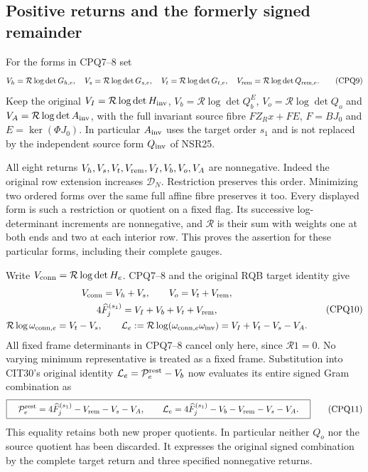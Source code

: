 \documentclass[11pt,a4paper]{article}
\begin{document}
\subsection{Positive returns and the formerly signed remainder}
For the forms in CPQ7--8 set
\[
 V_h=\mathcal R\log\det G_{h,e},\quad
 V_s=\mathcal R\log\det G_{s,e},\quad
 V_t=\mathcal R\log\det G_{t,e},\quad
 V_{\rm rem}=\mathcal R\log\det Q_{{\rm rem},e}.
 \tag{CPQ9}
\]
Keep the original $V_I=\mathcal R\log\det H_{\rm inv}$,
$V_b=\mathcal R\log\det Q_b^E$,
$V_o=\mathcal R\log\det Q_o$ and
$V_A=\mathcal R\log\det A_{\rm inv}$, with the full invariant
source fibre $FZ_Rx+FE$, $F=BJ_0$ and
$E=\ker(\Phi J_0)$. In particular $A_{\rm inv}$ uses the target
order $s_1$ and is not replaced by the independent source form
$Q_{\rm inv}$ of NSR25.

All eight returns $V_h,V_s,V_t,V_{\rm rem},V_I,V_b,V_o,V_A$
are nonnegative. Indeed the original row extension increases
$\mathcal D_N$. Restriction preserves this order. Minimizing two
ordered forms over the same full affine fibre preserves it too.
Every displayed form is such a restriction or quotient on a fixed
flag. Its successive log-determinant increments are nonnegative,
and $\mathcal R$ is their sum with weights one at both ends and
two at each interior row. This proves the assertion for these
particular forms, including their complete gauges.

Write $V_{\rm conn}=\mathcal R\log\det H_e$. CPQ7--8 and the
original RQB target identity give
\[
 \begin{gathered}
 V_{\rm conn}=V_h+V_s,\qquad V_o=V_t+V_{\rm rem},\\
 4\widehat F_j^{(s_1)}=V_I+V_b+V_t+V_{\rm rem},\\
 \mathcal R\log\omega_{{\rm conn},e}=V_t-V_s,\qquad
 \mathcal L_e:=\mathcal R\log(\omega_{{\rm conn},e}
                          \omega_{\rm inv})=V_I+V_t-V_s-V_A.
 \end{gathered}\tag{CPQ10}
\]
All fixed frame determinants in CPQ7--8 cancel only here, since
$\mathcal R1=0$. No varying minimum representative is treated as
a fixed frame. Substitution into CIT30's original identity
$\mathcal L_e=\mathcal P_e^{\rm rest}-V_b$ now evaluates its
entire signed Gram combination as
\[
 \boxed{\quad
 \mathcal P_e^{\rm rest}
     =4\widehat F_j^{(s_1)}-V_{\rm rem}-V_s-V_A,
 \qquad
 \mathcal L_e
     =4\widehat F_j^{(s_1)}-V_b-V_{\rm rem}-V_s-V_A.
 \quad}\tag{CPQ11}
\]
This equality retains both new proper quotients. In particular
neither $Q_o$ nor the source quotient has been discarded. It
expresses the original signed combination by the complete target
return and three specified nonnegative returns.
\end{document}
